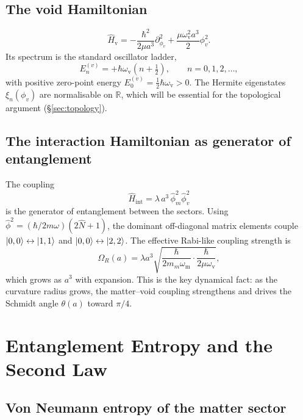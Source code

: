 \documentclass[12pt,a4paper]{article}
\theoremstyle{plain}
\theoremstyle{definition}
\newcommand{\Hv}{\hat{H}_{\mathrm{v}}}
\newcommand{\Hint}{\hat{H}_{\mathrm{int}}}
\newcommand{\omm}{\omega_{\mathrm{m}}}
\newcommand{\omv}{\omega_{\mathrm{v}}}
\begin{document}
\subsection{The void Hamiltonian}

\begin{equation}
  \Hv = -\frac{\hbar^2}{2\mu a^3}\partial_{\phi_v}^2
       + \frac{\mu\omv^2 a^3}{2}\phi_v^2.
  \label{eq:Hv}
\end{equation}
Its spectrum is the standard oscillator ladder,
\begin{equation}
  E_n^{(v)} = +\hbar\omv\!\left(n+\tfrac{1}{2}\right),
  \qquad n = 0,1,2,\ldots,
  \label{eq:Ev_spectrum}
\end{equation}
with positive zero-point energy
$E_0^{(v)} = \tfrac{1}{2}\hbar\omv > 0$.
The Hermite eigenstates $\xi_n(\phi_v)$ are normalisable on $\mathbb{R}$,
which will be essential for the topological argument (\S\ref{sec:topology}).

\subsection{The interaction Hamiltonian as generator of entanglement}

The coupling
\begin{equation}
  \Hint = \lambda\,a^3\,\hat\phi_m^2\hat\phi_v^2
  \label{eq:Hint}
\end{equation}
is the generator of entanglement between the sectors.
Using $\hat\phi^2 = (\hbar/2m\omega)(2\hat N + 1)$, the dominant
off-diagonal matrix elements couple
$\ket{0,0}\leftrightarrow\ket{1,1}$ and
$\ket{0,0}\leftrightarrow\ket{2,2}$.
The effective Rabi-like coupling strength is
\begin{equation}
  \Omega_R(a) = \lambda a^3\sqrt{
    \frac{\hbar}{2m_m\omm}\cdot\frac{\hbar}{2\mu\omv}},
  \label{eq:Rabi}
\end{equation}
which grows as $a^3$ with expansion. This is the key dynamical fact: as the
curvature radius grows, the matter--void coupling strengthens and drives the
Schmidt angle $\theta(a)$ toward $\pi/4$.

\section{Entanglement Entropy and the Second Law}
\label{sec:entropy}

\subsection{Von Neumann entropy of the matter sector}
\end{document}
